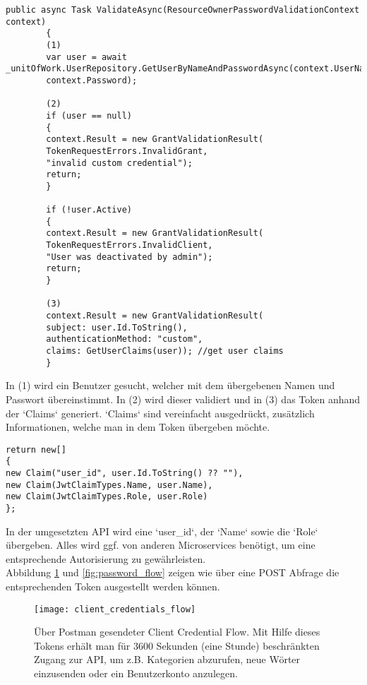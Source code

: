 \begin{verbatim}
public async Task ValidateAsync(ResourceOwnerPasswordValidationContext context)
		{
		(1)
		var user = await _unitOfWork.UserRepository.GetUserByNameAndPasswordAsync(context.UserName,
		context.Password);
		
		(2)
		if (user == null)
		{
		context.Result = new GrantValidationResult(
		TokenRequestErrors.InvalidGrant,
		"invalid custom credential");
		return;
		}
		
		if (!user.Active)
		{
		context.Result = new GrantValidationResult(
		TokenRequestErrors.InvalidClient,
		"User was deactivated by admin");
		return;
		}
		
		(3)
		context.Result = new GrantValidationResult(
		subject: user.Id.ToString(),
		authenticationMethod: "custom",
		claims: GetUserClaims(user)); //get user claims
		}
\end{verbatim}

In (1) wird ein Benutzer gesucht, welcher mit dem übergebenen Namen und Passwort übereinstimmt. In (2) wird dieser validiert und in (3) das Token anhand der `Claims` generiert. `Claims` sind vereinfacht ausgedrückt, zusätzlich Informationen, welche man in dem Token übergeben möchte. 

\begin{verbatim}
return new[]
{
new Claim("user_id", user.Id.ToString() ?? ""),
new Claim(JwtClaimTypes.Name, user.Name),
new Claim(JwtClaimTypes.Role, user.Role)
};
\end{verbatim}

In der umgesetzten API wird eine `user\_id`, der `Name` sowie die `Role` übergeben. Alles wird ggf. von anderen Microservices benötigt, um eine entsprechende Autorisierung zu gewährleisten.\\

Abbildung \ref{fig:client_credentials_flow} und \ref{fig:password_flow} zeigen wie über eine POST Abfrage die entsprechenden Token ausgestellt werden können.\\

\begin{figure}[ht]
	\centering
	\texttt{[image: client\_credentials\_flow]}
	\caption[Über Postman gesendeter Client Credential Flow] {Über Postman gesendeter Client Credential Flow. Mit Hilfe dieses Tokens erhält man für 3600 Sekunden (eine Stunde) beschränkten Zugang zur API, um  z.B. Kategorien abzurufen, neue Wörter einzusenden oder ein Benutzerkonto anzulegen.}
	\label{fig:client_credentials_flow}
\end{figure} 

